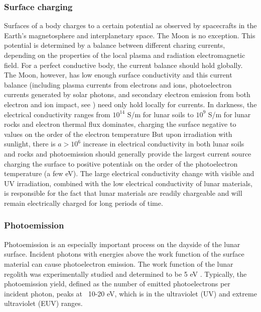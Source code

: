 \subsubsection{Surface charging}

Surfaces of a body charges to a certain potential as observed by spacecrafts in the Earth's magnetosphere and interplanetary space. The Moon is no exception. This potential is determined by a balance between different charing currents, depending on the properties of the local plasma and radiation electromagnetic field. For a perfect conductive body, the current balance should hold globally. The Moon, however, has low enough surface conductivity \citep{pingLunarSurfaceElectrical2017} and this current balance (including plasma currents from electrons and ions, photoelectron currents generated by solar photons, and secondary electron emission from both electron and ion impact, see \cite{whipplePotentialsSurfacesSpace1981}) need only hold locally for currents. In darkness, the electrical conductivity ranges from $10^{14}$ S/m for lunar soils to $10^9$ S/m for lunar rocks and electron thermal flux dominates, charging the surface negative to values on the order of the electron temperature But upon irradiation with sunlight, there is $a > 10^6$ increase in electrical conductivity in both lunar soils and rocks and photoemission should generally provide the largest current source charging the surface to positive potentials on the order of the photoelectron temperature (a few eV). The large electrical conductivity change with visible and UV irradiation, combined with the low electrical conductivity of lunar materials, is responsible for the fact that lunar materials are readily chargeable and will remain electrically charged for long periods of time.

\subsubsection{Photoemission}

Photoemission is an especially important process on the dayside of the lunar surface. Incident photons with energies above the work function of the surface material can cause photoelectron emission. The work function of the lunar regolith was experimentally studied and determined to be 5 eV \citep{feuerbacherPhotoemissionLunarSurface1972}. Typically, the photoemission yield, defined as the number of emitted photoelectrons per incident photon, peaks at ~10-20 eV, which is in the ultraviolet (UV) and extreme ultraviolet (EUV) ranges.


